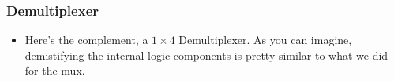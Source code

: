 \documentclass{beamer}
\begin{document}
\begin{frame}
\begin{tikzpicture}[x=0.75pt,y=0.75pt,yscale=-1,xscale=1]
\end{tikzpicture}

             \end{frame}


			\begin{frame}
				\frametitle{Demultiplexer}
				
				\begin{itemize}
					\item Here's the complement, a $1 \times 4$ Demultiplexer. As you can imagine, demistifying the internal logic components is pretty similar to what we did for the mux.
				\end{itemize}
				
				\centering
				
				


\begin{tikzpicture}[x=0.75pt,y=0.75pt,yscale=-1,xscale=1]


\end{tikzpicture}
\end{frame}
\end{document}
